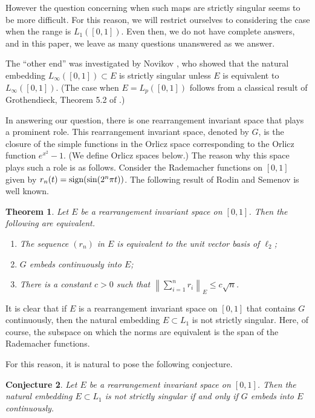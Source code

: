 \documentclass[numreferences]{kluwer}
\def\sign{\mathop{\hbox{sign}}}
\def\normo#1{\left\|#1\right\|}
\newtheorem{Theorem}{Theorem}
\newtheorem{Conjecture}[Theorem]{Conjecture}
\begin{document}
\begin{article}
However the question concerning when such maps are strictly singular seems
to be more difficult.  For this reason, we will restrict ourselves to
considering the case when the range is $L_1([0,1])$.  Even then, we do
not have complete answers, and in this paper, we leave as many questions
unanswered as we answer.

The ``other end'' was investigated by Novikov \cite{N}, who showed that
the natural embedding $L_\infty([0,1]) \subset E$ is strictly singular
unless $E$ is equivalent to $L_\infty([0,1])$.  (The case when 
$E = L_p([0,1])$ follows from a classical result of Grothendieck,
Theorem 5.2 of \cite{R}.)


In answering our question,
there is one rearrangement invariant space that plays a prominent role.
This rearrangement invariant
space, denoted by $G$, 
is the closure of the simple functions
in the Orlicz space corresponding to the Orlicz function $e^{x^2}-1$.  
(We define Orlicz spaces below.)
The reason why this space plays such a role is as follows.
Consider the Rademacher functions on $[0,1]$ given by
$r_n(t) = \sign(\sin(2^n \pi t))$.  The following
result of Rodin and Semenov \cite{RS} is well known.

\begin{Theorem}  
\label{rodin-sem}
Let $E$ be a rearrangement invariant space on $[0,1]$.
Then the following are equivalent.
\begin{enumerate}
\item The sequence
$(r_n)$ in $E$ is equivalent to the unit vector basis of $\ell_2$;
\item $G$ embeds continuously into $E$;
\item There is a constant $c>0$ such that
$\normo{\sum_{i=1}^n r_i}_E \le c \sqrt n$.
\end{enumerate}
\end{Theorem}

It is clear that 
if $E$ is a rearrangement invariant space on $[0,1]$
that contains $G$ continuously, then the natural embedding
$E \subset L_1$ is not strictly singular.  Here, of course, the subspace
on which the norms are equivalent is the span of the Rademacher functions.

For this reason, it is natural to pose the following conjecture.

\begin{Conjecture}  
\label{ss-conj}
Let $E$ be a rearrangement invariant space on $[0,1]$.
Then the natural embedding $E \subset L_1$ is not strictly
singular if and only if $G$ embeds into $E$ continuously.
\end{Conjecture}


\end{article}
\end{document}
